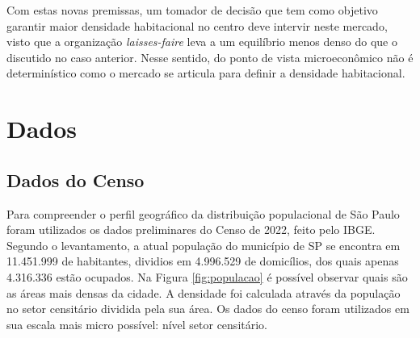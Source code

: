 
Com estas novas premissas, um tomador de decisão que tem como objetivo garantir maior densidade habitacional no centro deve intervir neste mercado, visto que a organização \textit{laisses-faire} leva a um equilíbrio menos denso do que o discutido no caso anterior. Nesse sentido, do ponto de vista microeconômico não é determinístico como o mercado se articula para definir a densidade habitacional.


\chapter{Dados}
\label{sec:dados}

\section*{Dados do Censo}

Para compreender o perfil geográfico da distribuição populacional de São Paulo foram utilizados os dados preliminares do Censo de 2022, feito pelo IBGE. Segundo o levantamento, a atual população do município de SP se encontra em 11.451.999 de habitantes, dividios em 4.996.529 de domicílios, dos quais apenas 4.316.336 estão ocupados. Na Figura \ref{fig:populacao} é possível observar quais são as áreas mais densas da cidade. A densidade foi calculada através da população no setor censitário dividida pela sua área. Os dados do censo foram utilizados em sua escala mais micro possível: nível setor censitário. 

